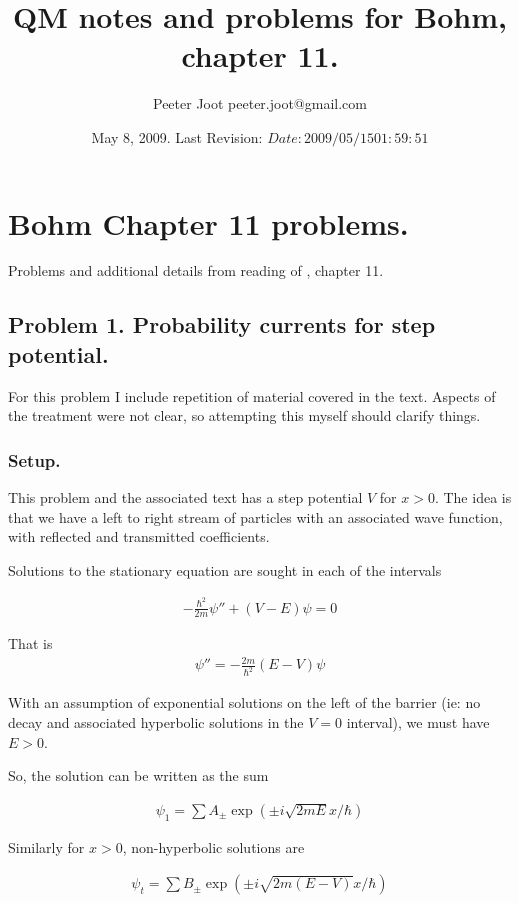 \documentclass{article}
\title{ QM notes and problems for Bohm, chapter 11. }
\author{Peeter Joot \quad peeter.joot@gmail.com }
\date{ May 8, 2009.  Last Revision: $Date: 2009/05/15 01:59:51 $ }
\begin{document}
\maketitle{}
\tableofcontents
\section{ Bohm Chapter 11 problems. }

Problems and additional details from reading of \cite{bohm1989qt}, chapter 11.

\subsection{ Problem 1.  Probability currents for step potential. }

For this problem I include repetition of material covered in the text.
Aspects of the treatment were not clear, so attempting this myself
should clarify things.

\subsubsection{ Setup. }

This problem and the associated text has a step potential $V$ for $x>0$.  The
idea is that we have a left to right stream of particles with an associated
wave function, with reflected and transmitted coefficients.

Solutions to the stationary equation are sought in each of the intervals

\begin{align}
-\frac{\hbar^2}{2m}\psi'' + (V-E)\psi = 0
\end{align}

That is
\begin{align}
\psi'' = - \frac{2m}{\hbar^2} (E-V)\psi
\end{align}

With an assumption of exponential solutions on the left of the barrier
(ie: no decay and associated hyperbolic solutions in the $V=0$ interval),
we must have $E>0$.

So, the solution can be written as the sum

\begin{align*}
\psi_1 = \sum A_{\pm} \exp\left( \pm i \sqrt{2mE} x / \hbar \right)
\end{align*}

Similarly for $x>0$, non-hyperbolic solutions are

\begin{align*}
\psi_t = \sum B_{\pm} \exp\left( \pm i \sqrt{2m(E-V)} x / \hbar \right)
\end{align*}
\end{document}
